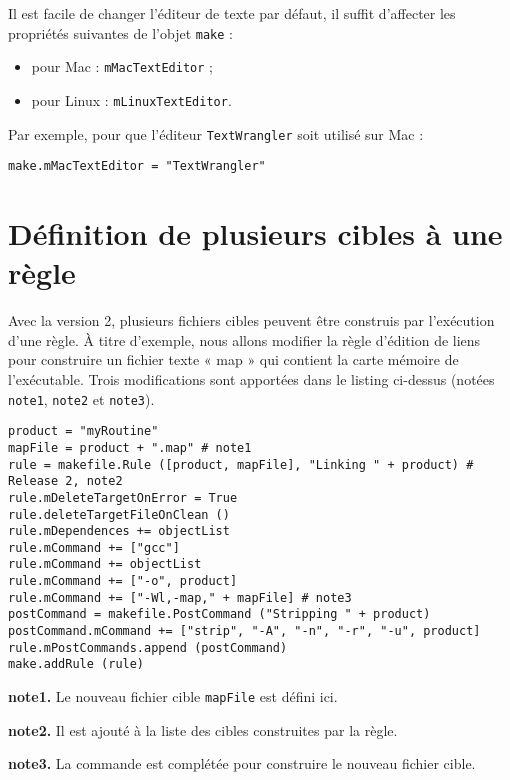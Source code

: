 \documentclass[a4paper,11pt]{extarticle}
\begin{document}
Il est facile de changer l'éditeur de texte par défaut, il suffit d'affecter les propriétés suivantes de l'objet \texttt{make} :
\begin{itemize}
\item pour Mac : \texttt{mMacTextEditor} ;
\item pour Linux : \texttt{mLinuxTextEditor}.
\end{itemize}

Par exemple, pour que l'éditeur \texttt{TextWrangler} soit utilisé sur Mac :
\begin{lstlisting}[language=Py]
make.mMacTextEditor = "TextWrangler"
\end{lstlisting}





\section{Définition de plusieurs cibles à une règle}\label{plusieursCibles}

Avec la version 2, plusieurs fichiers cibles peuvent être construis par l'exécution d'une règle. À titre d'exemple, nous allons modifier la règle d'édition de liens pour construire un fichier texte « map » qui contient la carte mémoire de l'exécutable. Trois modifications sont apportées dans le listing ci-dessus (notées \texttt{note1}, \texttt{note2} et \texttt{note3}).

\begin{lstlisting}[language=Py]
product = "myRoutine"
mapFile = product + ".map" # note1
rule = makefile.Rule ([product, mapFile], "Linking " + product) # Release 2, note2
rule.mDeleteTargetOnError = True
rule.deleteTargetFileOnClean ()
rule.mDependences += objectList
rule.mCommand += ["gcc"]
rule.mCommand += objectList
rule.mCommand += ["-o", product]
rule.mCommand += ["-Wl,-map," + mapFile] # note3
postCommand = makefile.PostCommand ("Stripping " + product)
postCommand.mCommand += ["strip", "-A", "-n", "-r", "-u", product]
rule.mPostCommands.append (postCommand)
make.addRule (rule)
\end{lstlisting}

{\bf note1.} Le nouveau fichier cible \texttt{mapFile} est défini ici.

{\bf note2.} Il est ajouté à la liste des cibles construites par la règle.

{\bf note3.} La commande est complétée pour construire le nouveau fichier cible.
\\~
\end{document}
